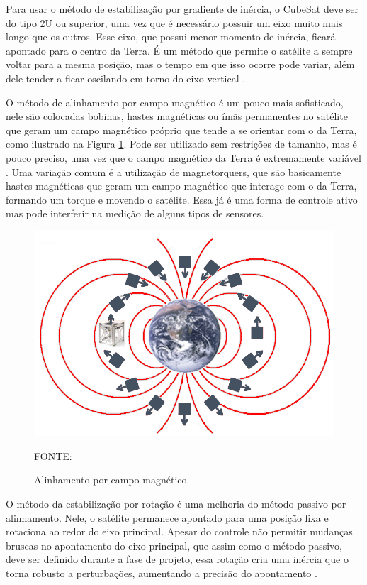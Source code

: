 \documentclass[
	12pt,				%
	openany,			%
	twoside,			%
	a4paper,			%
	english,			%
	french,				%
	spanish,			%
	brazil,				%
	oldfontcommands
	]{abntex2}
\begin{document}
Para usar o método de estabilização por gradiente de inércia, o CubeSat deve ser do tipo 2U ou superior, uma vez que é necessário possuir um eixo muito mais longo que os outros. Esse eixo, que possui menor momento de inércia, ficará apontado para o centro da Terra. É um método que permite o satélite a sempre voltar para a mesma posição, mas o tempo em que isso ocorre pode variar, além dele tender a ficar oscilando em torno do eixo vertical \cite{FrancLav}.

O método de alinhamento por campo magnético é um pouco mais sofisticado, nele são colocadas bobinas, hastes magnéticas ou ímãs permanentes no satélite que geram um campo magnético próprio que tende a se orientar com o da Terra, como ilustrado na Figura \ref{fig:Mag_Field}. Pode ser utilizado sem restrições de tamanho, mas é pouco preciso, uma vez que o campo magnético da Terra é extremamente variável \cite{FrancLav}. Uma variação comum é a utilização de magnetorquers, que são basicamente hastes magnéticas que geram um campo magnético que interage com o da Terra, formando um torque e movendo o satélite. Essa já é uma forma de controle ativo mas pode interferir na medição de alguns tipos de sensores.

\begin{figure}[th]
	\caption{Alinhamento por campo magnético}
	\centering
	\includegraphics[width=0.8\linewidth]{./figs/Mag_Field}
	
	\begin{small}
		FONTE: \cite{FrancLav}
	\end{small}
	\label{fig:Mag_Field}
\end{figure}

O método da estabilização por rotação é uma melhoria do método passivo por alinhamento. Nele, o satélite permanece apontado para uma posição fixa e rotaciona ao redor do eixo principal. Apesar do controle não permitir mudanças bruscas no apontamento do eixo principal, que assim como o método passivo, deve ser definido durante a fase de projeto, essa rotação cria uma inércia que o torna robusto a perturbações, aumentando a precisão do apontamento \cite{FrancLav}.
\end{document}
